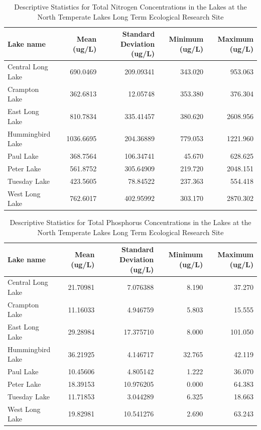 \documentclass[
]{article}
\begin{document}
\begin{table}[!h]

\caption{\label{tab:NandP.tbls}Descriptive Statistics for Total Nitrogen Concentrations in the Lakes at the North Temperate Lakes Long Term Ecological Research Site}
\centering
\begin{tabular}[t]{lrrrr}
\toprule
Lake name & Mean (ug/L) & Standard Deviation (ug/L) & Minimum (ug/L) & Maximum (ug/L)\\
\midrule
Central Long Lake & 690.0469 & 209.09341 & 343.020 & 953.063\\
Crampton Lake & 362.6813 & 12.05748 & 353.380 & 376.304\\
East Long Lake & 810.7834 & 335.41457 & 380.620 & 2608.956\\
Hummingbird Lake & 1036.6695 & 204.36889 & 779.053 & 1221.960\\
Paul Lake & 368.7564 & 106.34741 & 45.670 & 628.625\\
\addlinespace
Peter Lake & 561.8752 & 305.64909 & 219.720 & 2048.151\\
Tuesday Lake & 423.5605 & 78.84522 & 237.363 & 554.418\\
West Long Lake & 762.6017 & 402.95992 & 303.170 & 2870.302\\
\bottomrule
\end{tabular}
\end{table}

\begin{table}[!h]

\caption{\label{tab:NandP.tbls}Descriptive Statistics for Total Phosphorus Concentrations in the Lakes at the North Temperate Lakes Long Term Ecological Research Site}
\centering
\begin{tabular}[t]{lrrrr}
\toprule
Lake name & Mean (ug/L) & Standard Deviation (ug/L) & Minimum (ug/L) & Maximum (ug/L)\\
\midrule
Central Long Lake & 21.70981 & 7.076388 & 8.190 & 37.270\\
Crampton Lake & 11.16033 & 4.946759 & 5.803 & 15.555\\
East Long Lake & 29.28984 & 17.375710 & 8.000 & 101.050\\
Hummingbird Lake & 36.21925 & 4.146717 & 32.765 & 42.119\\
Paul Lake & 10.45606 & 4.805142 & 1.222 & 36.070\\
\addlinespace
Peter Lake & 18.39153 & 10.976205 & 0.000 & 64.383\\
Tuesday Lake & 11.71853 & 3.044289 & 6.325 & 18.663\\
West Long Lake & 19.82981 & 10.541276 & 2.690 & 63.243\\
\bottomrule
\end{tabular}
\end{table}
\end{document}
